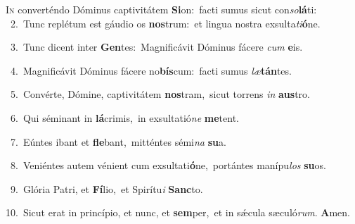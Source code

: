 \lettrine{\initial\textcolor{\initialcolor}{I}}{n} converténdo Dóminus captivitátem \textbf{Si}\-on:~\star facti sumus sicut con\-\textit{so}\-\textbf{lá}ti:\\
{\numbfont\textcolor{\numbcolor}{~2.}}~Tunc replétum est gáudio os \textbf{nos}\-trum:~\star et lingua nostra exsulta\-\textit{ti}\-\textbf{ó}ne.\par
{\numbfont\textcolor{\numbcolor}{~3.}}~Tunc dicent inter \textbf{Gen}\-tes:~\star Magnificávit Dóminus fácere \textit{cum} \textbf{e}\-is.\par
{\numbfont\textcolor{\numbcolor}{~4.}}~Magnificávit Dóminus fácere no\-\textbf{bís}\-cum:~\star facti sumus \textit{læ}\-\textbf{tán}tes.\par
{\numbfont\textcolor{\numbcolor}{~5.}}~Convérte, Dómine, captivitátem \textbf{nos}\-tram,~\star sicut torrens \textit{in} \textbf{aus}\-tro.\par
{\numbfont\textcolor{\numbcolor}{~6.}}~Qui séminant in \textbf{lá}\-crimis,~\star in exsultatió\textit{ne} \textbf{me}\-tent.\par
{\numbfont\textcolor{\numbcolor}{~7.}}~Eúntes ibant et \textbf{fle}\-bant,~\star mitténtes sémi\textit{na} \textbf{su}\-a.\par
{\numbfont\textcolor{\numbcolor}{~8.}}~Veniéntes autem vénient cum exsultati\-\textbf{ó}\-ne,~\star portántes manípu\textit{los} \textbf{su}\-os.\par
{\numbfont\textcolor{\numbcolor}{~9.}}~Glória Patri, et \textbf{Fí}\-lio,~\star et Spirítu\textit{i} \textbf{Sanc}\-to.\par
{\numbfont\textcolor{\numbcolor}{10.}}~Sicut erat in princípio, et nunc, et \textbf{sem}\-per,~\star et in sǽcula sæculó\-\textit{rum}\-. \textbf{A}\-men.\par
